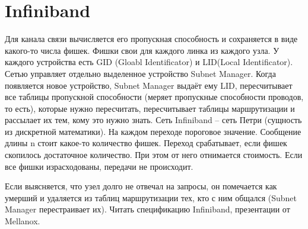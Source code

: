   \section{Infiniband}
  Для канала связи вычисляется его пропускная способность и сохраняется в виде какого-то числа фишек. Фишки свои для каждого линка из каждого узла.
  У каждого устройства есть GID (Gloabl Identificator) и LID(Local Identificator). Сетью управляет отдельно выделенное устройство Subnet Manager. Когда появляется новое устройство, Subnet Manager выдаёт ему LID, пересчитывает все таблицы пропускной способности (меряет пропускные способности проводов, то есть), которые нужно пересчитать, пересчитывает таблицы маршрутизации и рассылает их тем, кому это нужно знать. 
  Сеть Infiniband -- сеть Петри (сущность из дискретной математики). На каждом переходе пороговое значение. Сообщение длины n стоит какое-то количество фишек. Переход срабатывает, если фишек скопилось достаточное количество. При этом от него отнимается стоимость. Если все фишки израсходованы, передачи не происходит.
  
  Если выясняется, что узел долго не отвечал на запросы, он помечается как умерший и удаляется из таблиц маршрутизации тех, кто с ним общался (Subnet Manager перестраивает их). 
  Читать спецификацию Infiniband, презентации от Mellanox.
  

